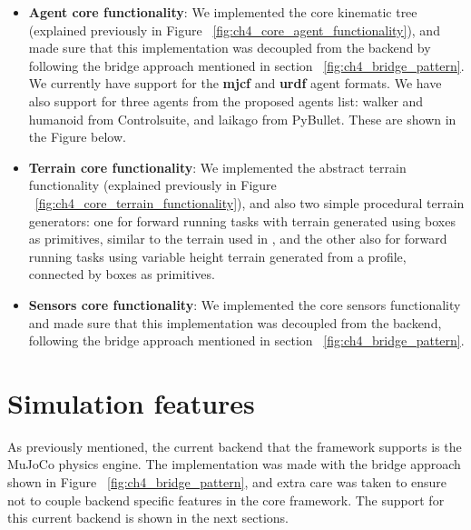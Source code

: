 \begin{itemize}
    \item \textbf{Agent core functionality}: We implemented the core kinematic 
            tree (explained previously in Figure ~\ref{fig:ch4_core_agent_functionality}), 
            and made sure that this implementation was decoupled from the backend by
            following the bridge approach mentioned in section ~\ref{fig:ch4_bridge_pattern}.
            We currently have support for the \textbf{mjcf} and \textbf{urdf} agent 
            formats. We have also support for three agents from the proposed agents list:
            walker and humanoid from Controlsuite, and laikago from PyBullet. These
            are shown in the Figure below.

            \figSupportedAgents

    \item \textbf{Terrain core functionality}: We implemented the abstract terrain
           functionality (explained previously in Figure ~\ref{fig:ch4_core_terrain_functionality}),
           and also two simple procedural terrain generators: one for forward running
           tasks with terrain generated using boxes as primitives, similar to the
           terrain used in \cite{DeepmindEmergenceLocomotion}, and the other also
           for forward running tasks using variable height terrain generated from a
           profile, connected by boxes as primitives.

    \item \textbf{Sensors core functionality}: We implemented the core sensors
          functionality and made sure that this implementation was decoupled from
          the backend, following the bridge approach mentioned in section ~\ref{fig:ch4_bridge_pattern}.

\end{itemize}



\section{Simulation features}

As previously mentioned, the current backend that the framework supports is the
MuJoCo physics engine. The implementation was made with the bridge approach shown
in Figure ~\ref{fig:ch4_bridge_pattern}, and extra care was taken to ensure not
to couple backend specific features in the core framework. The support for this 
current backend is shown in the next sections.

